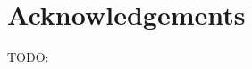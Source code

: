 \documentclass[letterpaper]{sig-alternate}
\begin{document}

\section{Acknowledgements}
 TODO:


\end{document}
